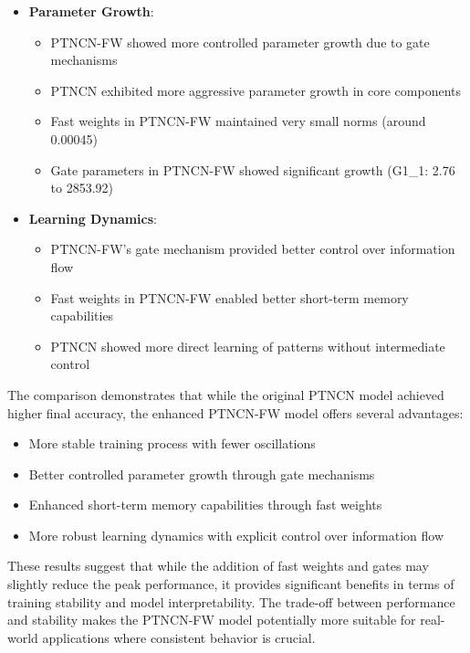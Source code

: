 \documentclass{article}
\begin{document}
\begin{itemize}
    \item \textbf{Parameter Growth}:
    \begin{itemize}
        \item PTNCN-FW showed more controlled parameter growth due to gate mechanisms
        \item PTNCN exhibited more aggressive parameter growth in core components
        \item Fast weights in PTNCN-FW maintained very small norms (around 0.00045)
        \item Gate parameters in PTNCN-FW showed significant growth (G1\_1: 2.76 to 2853.92)
    \end{itemize}

    \item \textbf{Learning Dynamics}:
    \begin{itemize}
        \item PTNCN-FW's gate mechanism provided better control over information flow
        \item Fast weights in PTNCN-FW enabled better short-term memory capabilities
        \item PTNCN showed more direct learning of patterns without intermediate control
    \end{itemize}
\end{itemize}

The comparison demonstrates that while the original PTNCN model achieved higher final accuracy, the enhanced PTNCN-FW model offers several advantages:

\begin{itemize}
    \item More stable training process with fewer oscillations
    \item Better controlled parameter growth through gate mechanisms
    \item Enhanced short-term memory capabilities through fast weights
    \item More robust learning dynamics with explicit control over information flow
\end{itemize}

These results suggest that while the addition of fast weights and gates may slightly reduce the peak performance, it provides significant benefits in terms of training stability and model interpretability. The trade-off between performance and stability makes the PTNCN-FW model potentially more suitable for real-world applications where consistent behavior is crucial.
\end{document}
